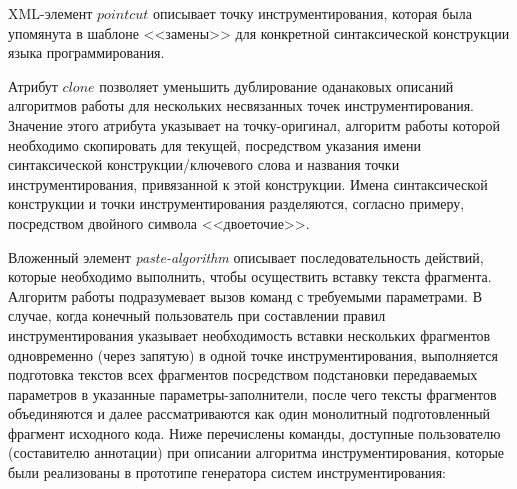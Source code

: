 XML-элемент $pointcut$ описывает точку инструментирования, которая была упомянута в шаблоне <<замены>> для конкретной синтаксической конструкции языка программирования.

Атрибут $clone$ позволяет уменьшить дублирование оданаковых описаний алгоритмов работы для нескольких несвязанных точек инструментирования.
Значение этого атрибута указывает на точку-оригинал, алгоритм работы которой необходимо скопировать для текущей, посредством указания имени синтаксической конструкции/ключевого слова и названия точки инструментирования, привязанной к этой конструкции.
Имена синтаксической конструкции и точки инструментирования разделяются, согласно примеру, посредством двойного символа <<двоеточие>>.

Вложенный элемент \textit{paste-algorithm} описывает последовательность действий, которые необходимо выполнить, чтобы осуществить вставку текста фрагмента.
Алгоритм работы подразумевает вызов команд с требуемыми параметрами.
В случае, когда конечный пользователь при составлении правил инструментирования указывает необходимость вставки нескольких фрагментов одновременно (через запятую) в одной точке инструментирования, выполняется подготовка текстов всех фрагментов посредством подстановки передаваемых параметров в указанные параметры-заполнители, после чего тексты фрагментов объединяются и далее рассматриваются как один монолитный подготовленный фрагмент исходного кода.
Ниже перечислены команды, доступные пользователю (составителю аннотации) при описании алгоритма инструментирования, которые были реализованы в прототипе генератора систем инструментирования:


